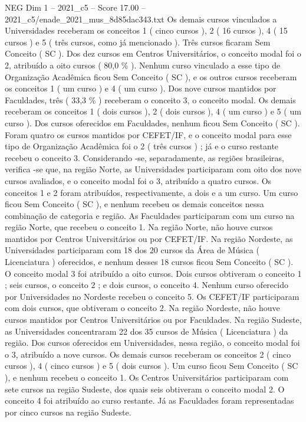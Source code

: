 \begin{textsample}{NEG Dim 1 – 2021\_c5 – Score 17.00 – 2021\_c5/enade\_2021\_mus\_8d85dac343.txt}
Os demais cursos vinculados a Universidades receberam os conceitos 1 ( cinco cursos ), 2 ( 16 cursos ), 4 ( 15 cursos ) e 5 ( três cursos, como já mencionado ).
Três cursos ficaram Sem Conceito ( SC ).
Dos dez cursos em Centros Universitários, o conceito modal foi o 2, atribuído a oito cursos ( 80,0 \% ).
Nenhum curso vinculado a esse tipo de Organização Acadêmica ficou Sem Conceito ( SC ), e os outros cursos receberam os conceitos 1 ( um curso ) e 4 ( um curso ).
Dos nove cursos mantidos por Faculdades, três ( 33,3 \% ) receberam o conceito 3, o conceito modal.
Os demais receberam os conceitos 1 ( dois cursos ), 2 ( dois cursos ), 4 ( um curso ) e 5 ( um curso ).
Dos cursos oferecidos em Faculdades, nenhum ficou Sem Conceito ( SC ).
Foram quatro os cursos mantidos por CEFET/IF, e o conceito modal para esse tipo de Organização Acadêmica foi o 2 ( três cursos ) ; já e o curso restante recebeu o conceito 3.
Considerando -se, separadamente, as regiões brasileiras, verifica -se que, na região Norte, as Universidades participaram com oito dos nove cursos avaliados, e o conceito modal foi o 3, atribuído a quatro cursos.
Os conceitos 1 e 2 foram atribuídos, respectivamente, a dois e a um curso.
Um curso ficou Sem Conceito ( SC ), e nenhum recebeu os demais conceitos nessa combinação de categoria e região.
As Faculdades participaram com um curso na região Norte, que recebeu o conceito 1.
Na região Norte, não houve cursos mantidos por Centros Universitários ou por CEFET/IF.
Na região Nordeste, as Universidades participaram com 18 dos 20 cursos da Área de Música ( Licenciatura ) oferecidos, e nenhum desses 18 cursos ficou Sem Conceito ( SC ).
O conceito modal 3 foi atribuído a oito cursos.
Dois cursos obtiveram o conceito 1 ; seis cursos, o conceito 2 ; e dois cursos, o conceito 4.
Nenhum curso oferecido por Universidades no Nordeste recebeu o conceito 5.
Os CEFET/IF participaram com dois cursos, que obtiveram o conceito 2.
Na região Nordeste, não houve cursos mantidos por Centros Universitários ou por Faculdades.
Na região Sudeste, as Universidades concentraram 22 dos 35 cursos de Música ( Licenciatura ) da região.
Dos cursos oferecidos em Universidades, nessa região, o conceito modal foi o 3, atribuído a nove cursos.
Os demais cursos receberam os conceitos 2 ( cinco cursos ), 4 ( cinco cursos ) e 5 ( dois cursos ).
Um curso ficou Sem Conceito ( SC ), e nenhum recebeu o conceito 1.
Os Centros Universitários participaram com sete cursos na região Sudeste, dos quais seis obtiveram o conceito modal 2.
O conceito 4 foi atribuído ao curso restante.
Já as Faculdades foram representadas por cinco cursos na região Sudeste.

\end{textsample}

